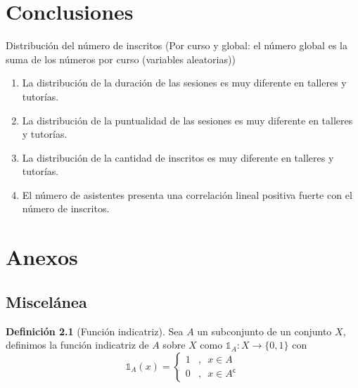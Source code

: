 \documentclass[11pt,a4paper]{book}
\theoremstyle{definition}%
\newtheorem{definicion}[teorema]{Definici\'on}
\newcommand{\setcomplement}{\mathsf{c}}
\begin{document}
    \chapter{Conclusiones}
        Distribución del número de inscritos (Por curso y global: el número global es la suma de los números por curso (variables aleatorias))
        \begin{enumerate}
            \item La distribución de la duración de las sesiones es muy diferente en talleres y tutorías.
            \item La distribución de la puntualidad de las sesiones es muy diferente en talleres y tutorías.
            \item La distribución de la cantidad de inscritos es muy diferente en talleres y tutorías.
            \item El número de asistentes presenta una correlación lineal positiva fuerte con el número de inscritos.
        \end{enumerate}
    \chapter{Anexos}
        \section{Miscelánea}
            \begin{definicion}[Función indicatriz]
                Sea $A$ un subconjunto de un conjunto $X$, definimos la función indicatriz de $A$ sobre $X$ como $\mathds{1}_A:X\longrightarrow\{0,1\}$ con
                \begin{equation*}
                    \mathds{1}_A (x)=\left\{\begin{array}{cl}
                        1&,\enspace x\in A  \\
                        0&,\enspace x \in A^\setcomplement
                    \end{array}\right.
                \end{equation*}
            \end{definicion}
\end{document}
